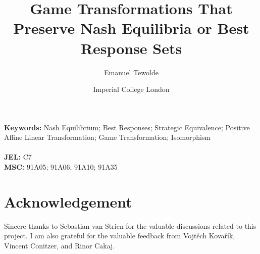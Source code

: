 \documentclass[a4paper, 11pt]{article}
\title{ \textbf{Game Transformations That Preserve Nash Equilibria or Best Response Sets} } %
\author{ {\Large Emanuel Tewolde} }
\date{ Imperial College London}
\begin{document}
\maketitle



\noindent
\textbf{Keywords:} Nash Equilibrium; Best Responses; Strategic Equivalence; Positive Affine Linear Transformation; Game Transformation; Isomorphism
\\
\, \\
\textbf{JEL:} C7
\\
\textbf{MSC:} 91A05; 91A06; 91A10; 91A35
\newpage










\section*{Acknowledgement}
Sincere thanks to Sebastian van Strien for the valuable discussions related to this project. I am also grateful for the valuable feedback from Vojtěch Kovařík, Vincent Conitzer, and Rinor Cakaj.

\printbibliography[heading=bibintoc]
%
%

\appendix






\end{document}
